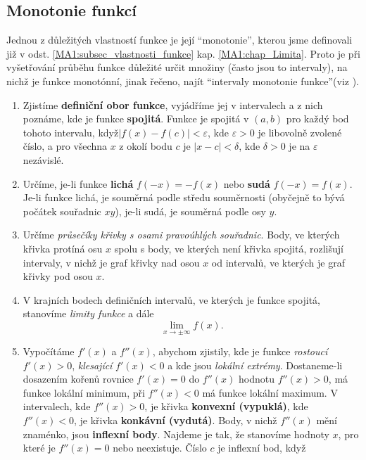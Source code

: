     \subsection{Monotonie funkcí}
      Jednou z důležitých vlastností funkce je její \textquotedblleft monotonie\textquotedblright, kterou jsme definovali již v odst. 
      \ref{MA1:subsec_vlastnosti_funkce} kap. \ref{MA1:chap_Limita}. Proto je při vyšetřování průběhu funkce důležité určit množiny (často jsou to intervaly), na 
      nichž je funkce monotónní, jinak řečeno, najít \textquotedblleft intervaly monotonie funkce\textquotedblright (viz \cite[s.~208]{Brabec1989}). 
    \begin{enumerate}
      \item Zjistíme \textbf{definiční obor funkce}, vyjádříme jej v intervalech a z nich poznáme, kde je funkce \textbf{spojitá}. Funkce je spojitá v $(a,b)$ pro 
            každý bod tohoto intervalu, když$|f(x)-f(c)|<\varepsilon$, kde $\varepsilon>0$ je libovolně zvolené číslo, a pro všechna $x$ z okolí bodu $c$ je  
            $|x-c|<\delta$, kde $\delta>0$ je na $\varepsilon$ nezávislé.
      \item Určíme, je-li funkce \textbf{lichá} $f(-x)=-f(x)$ nebo \textbf{sudá} $f(-x)=f(x)$. Je-li funkce lichá, je souměrná podle středu souměrnosti (obyčejně to 
            bývá počátek souřadnic $xy$), je-li sudá, je souměrná podle osy $y$.
      \item Určíme \emph{průsečíky křivky s osami pravoúhlých souřadnic}. Body, ve kte\-rých křivka protíná osu $x$ spolu s body, ve kte\-rých není křivka spojitá, 
            rozlišují intervaly, v nichž je graf křivky nad osou $x$ od intervalů, ve kterých je graf křivky pod osou $x$.
      \item V krajních bodech definičních intervalů, ve kterých je funkce spojitá, stano\-víme \emph{limity funkce} a dále $$\lim_{x \to \pm \infty}f(x).$$
      \item Vypočítáme $f'(x)$ a $f''(x)$, abychom zjistily, kde je funkce \emph{rostoucí} $f'(x)>0$, \emph{klesající} $f'(x)<0$ a kde jsou \emph{lokální extrémy}. 
            Dostaneme-li dosazením kořenů rovnice $f'(x)=0$ do $f''(x)$ hodnotu $f''(x)>0$, má funkce lokální minimum, při $f''(x)<0$ má funkce lokální maximum. 
            V intervalech, kde $f''(x)>0$, je křivka \textbf{konvexní (vypuklá)}, kde $f''(x)<0$, je křivka \textbf{konkávní (vydutá)}. Body, v nichž $f''(x)$ mění 
            znaménko, jsou \textbf{inflexní body}. Najdeme je tak, že stanovíme hodnoty $x$, pro které je $f''(x)=0$ nebo neexistuje. Číslo $c$ je inflexní bod, když

\end{enumerate}
